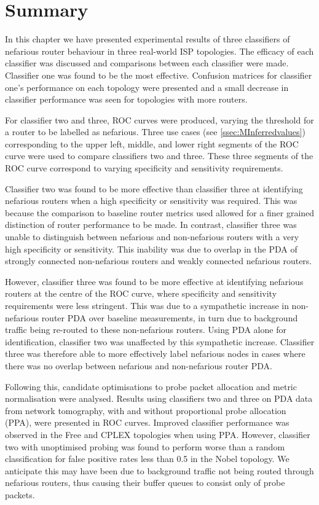 \section{Summary}
In this chapter we have presented experimental results of three classifiers of nefarious router behaviour in three real-world ISP topologies. The efficacy of each classifier was discussed and comparisons between each classifier were made. Classifier one was found to be the most effective. Confusion matrices for classifier one's performance on each topology were presented and a small decrease in classifier performance was seen for topologies with more routers.\par
For classifier two and three, ROC curves were produced, varying the threshold for a router to be labelled as nefarious. Three use cases (see \cref{ssec:MInferredvalues}) corresponding to the upper left, middle, and lower right segments of the ROC curve were used to compare classifiers two and three. These three segments of the ROC curve correspond to varying specificity and sensitivity requirements.\par
Classifier two was found to be more effective than classifier three at identifying nefarious routers when a high specificity or sensitivity was required. This was because the comparison to baseline router metrics used allowed for a finer grained distinction of router performance to be made. In contrast, classifier three was unable to distinguish between nefarious and non-nefarious routers with a very high specificity or sensitivity. This inability was due to overlap in the PDA of strongly connected non-nefarious routers and weakly connected nefarious routers.\par
However, classifier three was found to be more effective at identifying nefarious routers at the centre of the ROC curve, where specificity and sensitivity requirements were less stringent. This was due to a sympathetic increase in non-nefarious router PDA over baseline measurements, in turn due to background traffic being re-routed to these non-nefarious routers. Using PDA alone for identification, classifier two was unaffected by this sympathetic increase. Classifier three was therefore able to more effectively label nefarious nodes in cases where there was no overlap between nefarious and non-nefarious router PDA.\par
Following this, candidate optimisations to probe packet allocation and metric normalisation were analysed. Results using classifiers two and three on PDA data from network tomography, with and without proportional probe allocation (PPA), were presented in ROC curves. Improved classifier performance was observed in the Free and CPLEX topologies when using PPA. However, classifier two with unoptimised probing was found to perform worse than a random classification for false positive rates less than 0.5 in the Nobel topology. We anticipate this may have been due to background traffic not being routed through nefarious routers, thus causing their buffer queues to consist only of probe packets.\par
